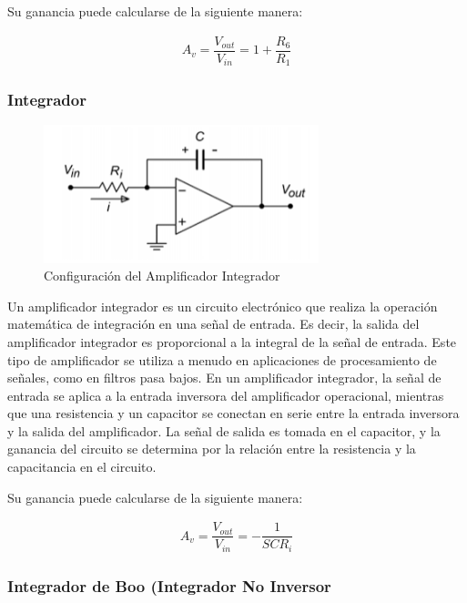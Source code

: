             Su ganancia puede calcularse de la siguiente manera:

             \begin{gather}
                A_v=\dfrac{V_{out}}{V_{in}}=1+\dfrac{R_6}{R_1}
            \end{gather}

        \subsubsection{Integrador}

            \begin{figure}[H]
                \centering
                \includegraphics[width=8cm]{Imagenes/integrador.png}
                \caption{Configuración del Amplificador Integrador}
                \label{fig:integrador0}
            \end{figure}

             Un amplificador integrador es un circuito electrónico que realiza la operación matemática de integración en una señal de entrada. Es decir, la salida del amplificador integrador es proporcional a la integral de la señal de entrada. Este tipo de amplificador se utiliza a menudo en aplicaciones de procesamiento de señales, como en filtros pasa bajos. En un amplificador integrador, la señal de entrada se aplica a la entrada inversora del amplificador operacional, mientras que una resistencia y un capacitor se conectan en serie entre la entrada inversora y la salida del amplificador. La señal de salida es tomada en el capacitor, y la ganancia del circuito se determina por la relación entre la resistencia y la capacitancia en el circuito.
             
             Su ganancia puede calcularse de la siguiente manera:

             \begin{gather}
                  A_v=\dfrac{V_{out}}{V_{in}}=-\dfrac{1}{SCR_i}
             \end{gather}

        \subsubsection{Integrador de Boo (Integrador No Inversor}

